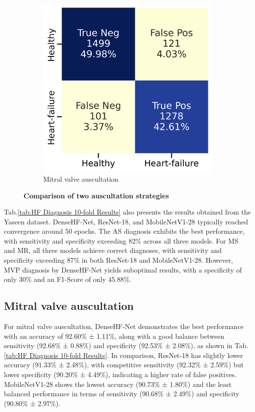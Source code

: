 \begin{figure}[htbp]
\begin{subfigure}[b]{0.45\textwidth}
        \includegraphics[width=\textwidth]{./figs/results/Confusion Matrix 1.png}
        \caption{Mitral valve auscultation}
        \label{fig:mitral_valve_1}
    \end{subfigure}
    \caption{\textbf{Comparison of two auscultation strategies}}
    \label{fig:comparison}
\end{figure}

Tab.\ref{tab:HF Diagnosis 10-fold Results} also presents the results obtained from the Yaseen dataset. DenseHF-Net, ResNet-18, and MobileNetV1-28 typically reached convergence around 50 epochs. The AS diagnosis exhibits the best performance, with sensitivity and specificity exceeding 82\% across all three models. For MS and MR, all three models achieve correct diagnoses, with sensitivity and specificity exceeding 87\% in both ResNet-18 and MobileNetV1-28. However, MVP diagnosis by DenseHF-Net yields suboptimal results, with a specificity of only 30\% and an F1-Score of only 45.88\%.




\subsection{Mitral valve auscultation}
For mitral valve auscultation, DenseHF-Net demonstrates the best performance with an accuracy of 92.60\% ± 1.11\%, along with a good balance between sensitivity (92.68\% ± 0.88\%) and specificity (92.53\% ± 2.08\%), as shown in Tab.\ref{tab:HF Diagnosis 10-fold Results}. In comparison, ResNet-18 has slightly lower accuracy (91.33\% ± 2.48\%), with competitive sensitivity (92.32\% ± 2.59\%) but lower specificity (90.20\% ± 4.49\%), indicating a higher rate of false positives. MobileNetV1-28 shows the lowest accuracy (90.73\% ± 1.80\%) and the least balanced performance in terms of sensitivity (90.68\% ± 2.49\%) and specificity (90.80\% ± 2.97\%).

